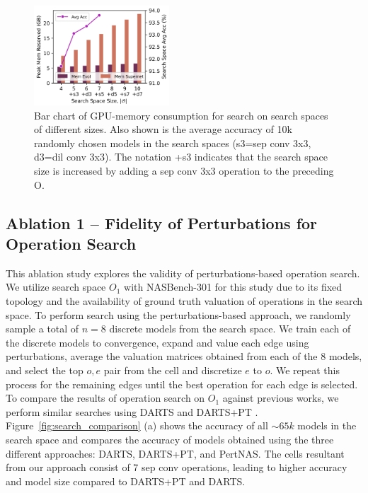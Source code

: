 \documentclass[onecolumn]{IEEEtran}
\begin{document}
\begin{figure}[ht]
	\centering
	\includegraphics[width=0.45\textwidth]{Figure-5.png}
	\caption{Bar chart of GPU-memory consumption for search on search spaces of different sizes. Also shown is the average accuracy of 10k randomly chosen models in the search spaces (s3=sep conv 3x3, d3=dil conv 3x3). The notation +s3 indicates that the search space size is increased by adding a sep conv 3x3 operation to the preceding O.}
	\label{fig:gpu_memory_consumption}
\end{figure}
	
\subsection{Ablation 1 – Fidelity of Perturbations for Operation Search}
This ablation study explores the validity of perturbations-based operation search. We utilize search space \( O_1 \) with NASBench-301 for this study due to its fixed topology and the availability of ground truth valuation of operations in the search space. To perform search using the perturbations-based approach, we randomly sample a total of \( n = 8 \) discrete models from the search space. We train each of the discrete models to convergence, expand and value each edge using perturbations, average the valuation matrices obtained from each of the 8 models, and select the top \( o,e \) pair from the cell and discretize \( e \) to \( o \). We repeat this process for the remaining edges until the best operation for each edge is selected. To compare the results of operation search on \( O_1 \) against previous works, we perform similar searches using DARTS \cite{Liu2018} and DARTS+PT \cite{Wang2021}. Figure~\ref{fig:search_comparison} (a) shows the accuracy of all $\sim 65k$ models in the search space and compares the accuracy of models obtained using the three different approaches: DARTS, DARTS+PT, and PertNAS. The cells resultant from our approach consist of 7 sep conv operations, leading to higher accuracy and model size compared to DARTS+PT and DARTS.
\end{document}
